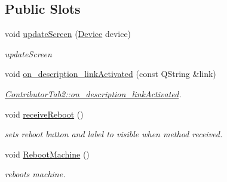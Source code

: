 \subsection*{Public Slots}
\begin{DoxyCompactItemize}
\item 
void \hyperlink{classContributorTab2_abf252c3c3cacdc4a4d1f369ffd4fbb99}{update\+Screen} (\hyperlink{classDevice}{Device} device)
\begin{DoxyCompactList}\small\item\em update\+Screen \end{DoxyCompactList}\item 
void \hyperlink{classContributorTab2_a22fb06bbd151a407ff40404897cabb4d}{on\+\_\+description\+\_\+link\+Activated} (const Q\+String \&link)
\begin{DoxyCompactList}\small\item\em \hyperlink{classContributorTab2_a22fb06bbd151a407ff40404897cabb4d}{Contributor\+Tab2\+::on\+\_\+description\+\_\+link\+Activated}. \end{DoxyCompactList}\item 
\mbox{\label{classContributorTab2_ab8a868f09884b9b5ce0e4aa7c6940166}} 
void \hyperlink{classContributorTab2_ab8a868f09884b9b5ce0e4aa7c6940166}{receive\+Reboot} ()
\begin{DoxyCompactList}\small\item\em sets reboot button and label to visible when method received. \end{DoxyCompactList}\item 
\mbox{\label{classContributorTab2_a3b818b61d87562521615de0b57f29a58}} 
void \hyperlink{classContributorTab2_a3b818b61d87562521615de0b57f29a58}{Reboot\+Machine} ()
\begin{DoxyCompactList}\small\item\em reboots machine. \end{DoxyCompactList}\end{DoxyCompactItemize}
